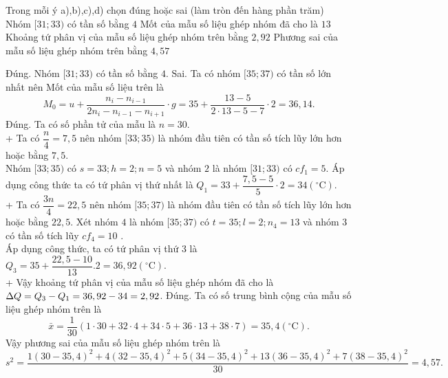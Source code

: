 \begin{ex}
	Trong mỗi ý a),b),c),d) chọn đúng hoặc sai (làm tròn đến hàng phần trăm)
	\choiceTF
	{\True Nhóm $[31 ; 33)$ có tần số bằng $4$}
	{Mốt của mẫu số liệu ghép nhóm đã cho là $13$}
	{\True Khoảng tứ phân vị của mẫu số liệu ghép nhóm trên bằng $2,92$}
	{\True  Phương sai của mẫu số liệu ghép nhóm trên bằng $4,57$}
	\loigiai
	{
		\begin{itemchoice}
			\itemch  Đúng. Nhóm $[31 ; 33)$ có tần số bằng $4$.
			\itemch  Sai. Ta có nhóm $[35 ; 37)$ có tần số lớn nhất nên Mốt của mẫu số liệu trên là $$M_0=u+\dfrac{n_i-n_{i-1}}{2 n_i-n_{i-1}-n_{i+1}} \cdot g=35+\dfrac{13-5}{2 \cdot 13-5-7} \cdot 2=36,14.$$
			\itemch Đúng. Ta có số phần tử của mẫu là $n=30$.\\
			+ Ta có $\dfrac{n}{4}=7,5$ nên nhóm $[33 ; 35)$ là nhóm đầu tiên có tần số tích lũy lớn hơn hoặc bằng $7,5$.\\
			Nhóm $[33 ; 35)$ có $s=33 ; h=2 ; n=5$ và nhóm $2$ là nhóm $[31 ; 33)$ có $c f_1=5$. Áp dụng công thức ta có tứ phân vị thứ nhất là $Q_1=33+\dfrac{7,5-5}{5} \cdot 2=34\left({ }^{\circ} \mathrm{C}\right)$.\\
			+ Ta có $\dfrac{3 n}{4}=22,5$ nên nhóm $[35 ; 37)$ là nhóm đầu tiên có tần số tích lũy lớn hơn hoặc bằng $22,5$.
			Xét nhóm $4$ là nhóm $[35 ; 37)$ có $t=35 ; l=2 ; n_4=13$ và nhóm $3$ có tần số tích lũy $c f_4=10$ .\\
			Áp dụng công thức, ta có tứ phân vị thứ 3 là $Q_3=35+\dfrac{22,5-10}{13} .2=36,92\left({ }^{\circ} \mathrm{C}\right)$.\\
			+ Vậy khoảng tứ phân vị của mẫu số liệu ghép nhóm đã cho là $\break \Delta Q=Q_3-Q_1=36,92-34=2,92$.
			\itemch Đúng. Ta có số trung bình cộng của mẫu số liệu ghép nhóm trên là $$\bar{x}=\dfrac{1}{30}(1\cdot30+32\cdot4+34
			\cdot5+36\cdot13+38\cdot7)=35,4\left({ }^{\circ} \mathrm{C}\right).$$
			Vậy phương sai của mẫu số liệu ghép nhóm trên là $$s^2=\dfrac{1(30-35,4)^2+4(32-35,4)^2+5(34-35,4)^2+13(36-35,4)^2+7(38-35,4)^2}{30}=4,57.$$
		\end{itemchoice}
	}
\end{ex}

